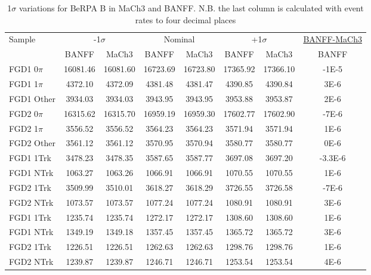 \begin{table}
	\centering
	\begin{tabular}{l | c c | c c | c c | c}
		\hline
		\hline
		Sample  & \multicolumn{2}{c|}{-1$\sigma$} & \multicolumn{2}{c|}{Nominal} & \multicolumn{2}{c|}{+1$\sigma$} & \underline{BANFF-MaCh3}\\
		&  BANFF  &  MaCh3  &  BANFF  &  MaCh3  & BANFF & MaCh3 & BANFF\\ 
		\hline
		FGD1 0$\pi$ &  16081.46 &  16081.60 &  16723.69 &  16723.80 &  17365.92 &  17366.10 &  -1E-5 \\ 
		FGD1 1$\pi$ &  4372.10 &  4372.09 &  4381.48 &  4381.47 &  4390.85 &  4390.84 &  3E-6 \\ 
		FGD1 Other &  3934.03 &  3934.03 &  3943.95 &  3943.95 &  3953.88 &  3953.87 &  2E-6 \\ 
		\hline
		FGD2 0$\pi$ &  16315.62 &  16315.70 &  16959.19 &  16959.30 &  17602.77 &  17602.90 &  -7E-6 \\ 
		FGD2 1$\pi$ &  3556.52 &  3556.52 &  3564.23 &  3564.23 &  3571.94 &  3571.94 &  1E-6 \\ 
		FGD2 Other &  3561.12 &  3561.12 &  3570.95 &  3570.94 &  3580.77 &  3580.77 &  0E-6 \\ 
		\hline
		FGD1 1Trk &  3478.23 &  3478.35 &  3587.65 &  3587.77 &  3697.08 &  3697.20 &  -3.3E-6 \\ 
		FGD1 NTrk &  1063.27 &  1063.26 &  1066.91 &  1066.91 &  1070.55 &  1070.55 &  1E-6 \\
		\hline
		FGD2 1Trk &  3509.99 &  3510.01 &  3618.27 &  3618.29 &  3726.55 &  3726.58 &  -7E-6 \\ 
		FGD2 NTrk &  1073.57 &  1073.57 &  1077.24 &  1077.24 &  1080.91 &  1080.91 &  3E-6 \\ 
		\hline
		FGD1 \numu 1Trk &  1235.74 &  1235.74 &  1272.17 &  1272.17 &  1308.60 &  1308.60 &  1E-6 \\ 
		FGD1 \numu NTrk &  1349.19 &  1349.18 &  1357.45 &  1357.45 &  1365.72 &  1365.72 &  3E-6 \\
		\hline
		FGD2 \numu 1Trk &  1226.51 &  1226.51 &  1262.63 &  1262.63 &  1298.76 &  1298.76 &  1E-6 \\ 
		FGD2 \numu NTrk &  1239.87 &  1239.87 &  1246.71 &  1246.71 &  1253.54 &  1253.54 &  4E-6 \\ 
		\hline
		\hline
	\end{tabular}
	\caption{1$\sigma$ variations for BeRPA B in MaCh3 and BANFF. N.B. the last column is calculated with event rates to four decimal places}
	\label{tab:1sigmavar_banff_berpa_b}
\end{table}

